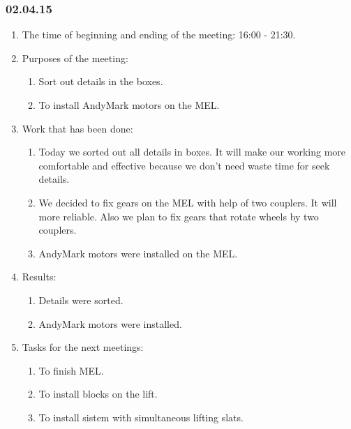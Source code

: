 \subsubsection{02.04.15}
\begin{enumerate}
	
	\item The time of beginning and ending of the meeting: 16:00 - 21:30.
	
	\item Purposes of the meeting: 
	\begin{enumerate}
		
		\item Sort out details in the boxes.
		
		\item To install AndyMark motors on the MEL.

	\end{enumerate}

	\item Work that has been done:
	\begin{enumerate}
		
		\item Today we sorted out all details in boxes. It will make our working more comfortable and effective because we don't need waste time for seek details.
		
		\item We decided to fix gears on the MEL with help of two couplers. It will more reliable. Also we plan to fix gears that rotate wheels by two couplers.
		
        \item AndyMark motors were installed on the MEL.
	\end{enumerate}   
	
	\item Results:
	\begin{enumerate}
		
		\item Details were sorted.
		
		\item AndyMark motors were installed.
		
	\end{enumerate}
	
	\item Tasks for the next meetings:
	\begin{enumerate}
		
		\item To finish MEL.
		
		\item To install blocks on the lift.
		
        \item To install sistem with simultaneous lifting slats.
			
	\end{enumerate}
\end{enumerate}
\fillpage
